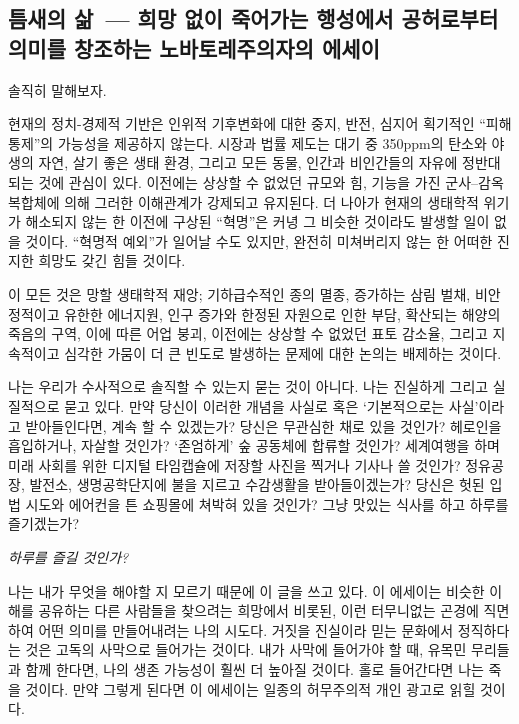 \documentclass[10pt, b6paper, openany]{memoir}
\title{\booktitle{}}
\author{프리드리히 루럴 루시퍼}
\date{2018}
\newcommand{\booktitle}{틈새의 삶}
\newcommand{\subtitle}{희망 없이 죽어가는 행성에서 공허로부터 의미를 창조하는 노바토레주의자의 에세이}
\newcommand{\fulltitle}{\booktitle{}~--- \subtitle{}}
\begin{document}
\frontmatter
\begin{titlingpage}
\begin{flushleft}
\maketitle
\end{flushleft}
\end{titlingpage}
\tableofcontents

\mainmatter
\begin{article}
\chapter{\fulltitle}
솔직히 말해보자. 

현재의 정치-경제적 기반은 인위적 기후변화에 대한 중지, 반전, 심지어 획기적인 ``피해 통제''의 가능성을 제공하지 않는다. 시장과 법률 제도는 대기 중 350ppm의 탄소와 야생의 자연, 살기 좋은 생태 환경, 그리고 모든 동물, 인간과 비인간들의 자유에 정반대되는 것에 관심이 있다. 이전에는 상상할 수 없었던 규모와 힘, 기능을 가진 군사--감옥 복합체에 의해 그러한 이해관계가 강제되고 유지된다. 더 나아가 현재의 생태학적 위기가 해소되지 않는 한 이전에 구상된 ``혁명''은 커녕 그 비슷한 것이라도 발생할 일이 없을 것이다. ``혁명적 예외''가 일어날 수도 있지만, 완전히 미쳐버리지 않는 한 어떠한 진지한 희망도 갖긴 힘들 것이다.

이 모든 것은 망할 생태학적 재앙; 기하급수적인 종의 멸종, 증가하는 삼림 벌채, 비안정적이고 유한한 에너지원, 인구 증가와 한정된 자원으로 인한 부담, 확산되는 해양의 죽음의 구역, 이에 따른 어업 붕괴, 이전에는 상상할 수 없었던 표토 감소율, 그리고 지속적이고 심각한 가뭄이 더 큰 빈도로 발생하는 문제에 대한 논의는 배제하는 것이다. 

나는 우리가 수사적으로 솔직할 수 있는지 묻는 것이 아니다. 나는 진실하게 그리고 실질적으로 묻고 있다. 만약 당신이 이러한 개념을 사실로 혹은 `기본적으로는 사실'이라고 받아들인다면, 계속 할 수 있겠는가? 당신은 무관심한 채로 있을 것인가? 헤로인을 흡입하거나, 자살할 것인가? `존엄하게' 숲 공동체에 합류할 것인가? 세계여행을 하며 미래 사회를 위한 디지털 타임캡슐에 저장할 사진을 찍거나 기사나 쓸 것인가? 정유공장, 발전소, 생명공학단지에 불을 지르고 수감생활을 받아들이겠는가? 당신은 헛된 입법 시도와 에어컨을 튼 쇼핑몰에 쳐박혀 있을 것인가? 그냥 맛있는 식사를 하고 하루를 즐기겠는가?

\emph{하루를 즐길 것인가?}

나는 내가 무엇을 해야할 지 모르기 때문에 이 글을 쓰고 있다. 이 에세이는 비슷한 이해를 공유하는 다른 사람들을 찾으려는 희망에서 비롯된, 이런 터무니없는 곤경에 직면하여 어떤 의미를 만들어내려는 나의 시도다. 거짓을 진실이라 믿는 문화에서 정직하다는 것은 고독의 사막으로 들어가는 것이다. 내가 사막에 들어가야 할 때, 유목민 무리들과 함께 한다면, 나의 생존 가능성이 훨씬 더 높아질 것이다. 홀로 들어간다면 나는 죽을 것이다. 만약 그렇게 된다면 이 에세이는 일종의 허무주의적 개인 광고로 읽힐 것이다.


\end{article}
\end{document}
